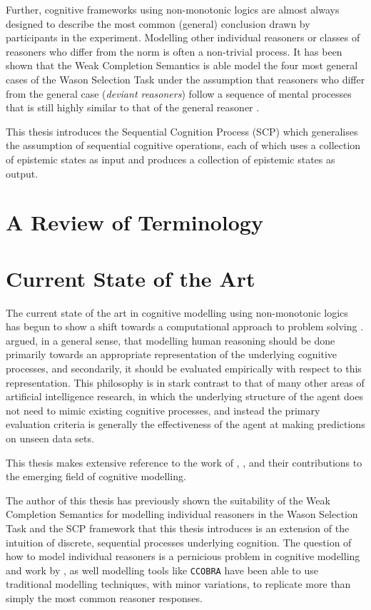Further, cognitive frameworks using non-monotonic logics are almost always designed to describe the most common (general) conclusion drawn by participants in the experiment. Modelling other individual reasoners or classes of reasoners who differ from the norm is often a non-trivial process. It has been shown that the Weak Completion Semantics \citep{holldobler2015weak} is able model the four most general cases of the Wason Selection Task under the assumption that reasoners who differ from the general case (\textit{deviant reasoners}) follow a sequence of mental processes that is still highly similar to that of the general reasoner \citep{breu2019weak}.

This thesis introduces the Sequential Cognition Process (SCP) which generalises the assumption of sequential cognitive operations, each of which uses a collection of epistemic states as input and produces a collection of epistemic states as output. 


\section{A Review of Terminology} \label{sec:terminology}
\section{Current State of the Art} \label{sec:soa}
The current state of the art in cognitive modelling using non-monotonic logics has begun to show a shift towards a computational approach to problem solving \citep{dietz2012computational}. \cite{stenning2012human} argued, in a general sense, that modelling human reasoning should be done primarily towards an appropriate representation of the underlying cognitive processes, and secondarily, it should be evaluated empirically with respect to this representation. This philosophy is in stark contrast to that of many other areas of artificial intelligence research, in which the underlying structure of the agent does not need to mimic existing cognitive processes, and instead the primary evaluation criteria is generally the effectiveness of the agent at making predictions on unseen data sets.

This thesis makes extensive reference to the work of \cite{dietz2012computational}, \cite{dietz2014modeling}, \cite{ragni2017wason} and their contributions to the emerging field of cognitive modelling. 

The author of this thesis has previously shown the suitability of the Weak Completion Semantics for modelling individual reasoners in the Wason Selection Task \citep{breu2019weak} and the SCP framework that this thesis introduces is an extension of the intuition of discrete, sequential processes underlying cognition. The question of how to model individual reasoners is a pernicious problem in cognitive modelling and work by \cite{breu2019weak}, as well modelling tools like \texttt{CCOBRA} \citep{ccobra} have been able to use traditional modelling techniques, with minor variations, to replicate more than simply the most common reasoner responses.



